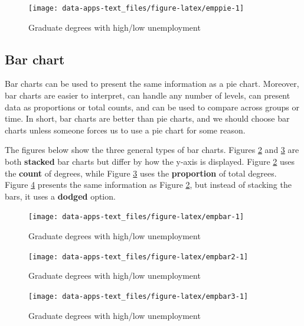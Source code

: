\documentclass[
]{book}
\begin{document}
\begin{figure}

{\centering \texttt{[image: data-apps-text\_files/figure-latex/emppie-1]} 

}

\caption{Graduate degrees with high/low unemployment}\label{fig:emppie}
\end{figure}

\hypertarget{bar-chart}{%
\subsection{Bar chart}\label{bar-chart}}

Bar charts can be used to present the same information as a pie chart. Moreover, bar charts are easier to interpret, can handle any number of levels, can present data as proportions or total counts, and can be used to compare across groups or time. In short, bar charts are better than pie charts, and we should choose bar charts unless someone forces us to use a pie chart for some reason.

The figures below show the three general types of bar charts. Figures \ref{fig:empbar} and \ref{fig:empbar2} are both \textbf{stacked} bar charts but differ by how the y-axis is displayed. Figure \ref{fig:empbar} uses the \textbf{count} of degrees, while Figure \ref{fig:empbar2} uses the \textbf{proportion} of total degrees. Figure \ref{fig:empbar3} presents the same information as Figure \ref{fig:empbar}, but instead of stacking the bars, it uses a \textbf{dodged} option.

\begin{figure}

{\centering \texttt{[image: data-apps-text\_files/figure-latex/empbar-1]} 

}

\caption{Graduate degrees with high/low unemployment}\label{fig:empbar}
\end{figure}

\begin{figure}

{\centering \texttt{[image: data-apps-text\_files/figure-latex/empbar2-1]} 

}

\caption{Graduate degrees with high/low unemployment}\label{fig:empbar2}
\end{figure}

\begin{figure}

{\centering \texttt{[image: data-apps-text\_files/figure-latex/empbar3-1]} 

}

\caption{Graduate degrees with high/low unemployment}\label{fig:empbar3}
\end{figure}
\end{document}

